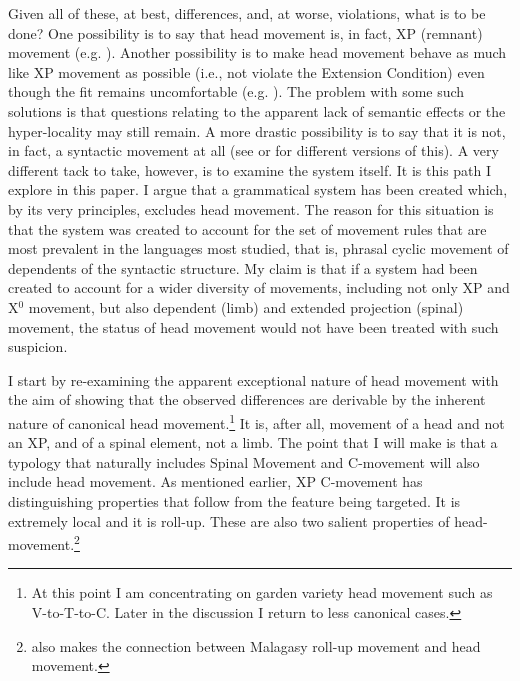 \documentclass[output=paper,colorlinks,citecolor=brown,
]{langscibook}
\begin{document}
Given all of these, at best, differences, and, at worse, violations, what is to be done?  One possibility is to say that head movement is, in fact, XP (remnant) movement (e.g. \citealt{Koopman:2000}).  Another possibility is to make head movement behave as much like XP movement as possible (i.e., not violate the Extension Condition) even though the fit remains uncomfortable (e.g. \citealt{Matushansky:2006}).  The problem with some such solutions is that questions relating to the apparent lack of semantic effects or the hyper-locality  may still remain.  A more drastic possibility is to say that it is not, in fact, a syntactic movement at all (see \citet{Chomsky:2001a} or \citet{Harley:2003a} for different versions of this).  A very different tack to take, however, is to examine the system itself.   It is this path I explore in this paper.  I argue that a grammatical system has been created which, by its very principles, excludes head movement.  The reason for this situation is that the system was created to account for the set of movement rules that are most prevalent in the languages most studied, that is, phrasal cyclic movement of dependents of the syntactic structure.  My claim is that if a system had been created to account for a wider diversity of movements, including not only XP and X$^0$ movement, but also dependent (limb)  and extended projection (spinal) movement, the status of head movement would not have been treated with such suspicion. 

I start by re-examining the apparent exceptional nature of head movement with the aim of showing that the observed differences are derivable by the inherent nature of canonical head movement.\footnote{At this point I am concentrating on garden variety head movement such as V-to-T-to-C.  Later in the discussion I  return to less canonical cases.}  It is, after all, movement of a head and not an XP, and of a spinal element, not a limb.   The point that I will make is that a typology that naturally includes Spinal Movement and C-movement will also include head movement. As mentioned earlier, XP C-movement has distinguishing properties that follow from the feature being targeted.  It is extremely local and it is roll-up.  These are also two salient properties of head-movement.\footnote{\citet{Pearson:2000} also makes the connection between Malagasy roll-up movement and head movement.}  
\end{document}
